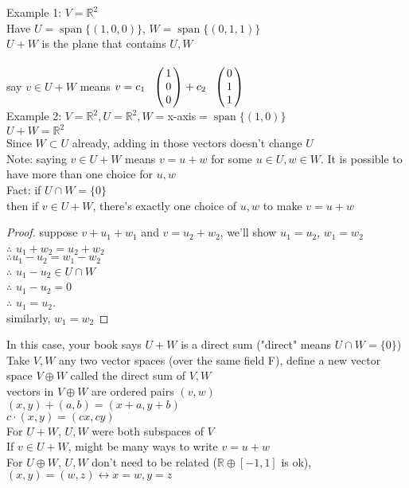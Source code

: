 \documentclass[11pt]{article}
\DeclareMathOperator{\Span}{span}
\begin{document}
Example 1: $V=\mathbb{R}^2$\\
Have $U=\Span\{(1,0,0)\}$, $W=\Span\{(0,1,1)\}$\\
$U+W$ is the plane that contains $U, W$\\
say $v\in U+W$ means $v=c_1\bordermatrix{~ & \cr &1\cr &0\cr &0}+c_2\bordermatrix{~ & \cr &0\cr &1\cr &1}$\\

Example 2: $V=\mathbb{R}^2, U=\mathbb{R}^2, W=$x-axis$=\Span\{(1,0)\}$\\
$U+W=\mathbb{R}^2$\\
Since $W\subset U$ already, adding in those vectors doesn't change $U$\\

Note: saying $v\in U+W$ means $v=u+w$ for some $u\in U, w\in W$. It is possible to have more than one choice for $u, w$\\

Fact: if $U\cap W=\{0\}$\\
then if $v\in U+W$, there's exactly one choice of $u, w$ to make $v=u+w$\\
\begin{proof}
suppose $v+u_1+w_1$ and $v=u_2+w_2$, we'll show $u_1=u_2$, $w_1=w_2$\\
$\therefore$ $u_1+w_2=u_2+w_2$\\
$\therefore u_1-u_2=w_1-w_2$\\
$\therefore$ $u_1-u_2\in U\cap W$\\
$\therefore$ $u_1-u_2=0$\\
$\therefore$ $u_1=u_2$.\\
similarly, $w_1=w_2$
\end{proof}
In this case, your book says $U+W$ is a direct sum ("direct" means $U\cap W=\{0\}$)\\
Take $V, W$ any two vector spaces (over the same field F), define a new vector space $V\oplus W$ called the direct sum of $V, W$\\
vectors in $V\oplus W$ are ordered pairs $(v, w)$\\
$(x, y)+(a, b)=(x+a, y+b)$\\
$c\cdot (x, y)=(cx, cy)$\\
For $U+W$, $U, W$ were both subspaces of $V$\\
If $v\in U+W$, might be many ways to write $v=u+w$\\
For $U\oplus W$, $U, W$ don't need to be related ($\mathbb{R}\oplus [-1, 1]$ is ok), $(x, y)=(w, z) \leftrightarrow x=w, y=z$\\
\end{document}
